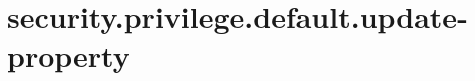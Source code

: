 \section{security.privilege.default.update-property}
\label{configuration:SecurityPrivilegeDefaultUpdateProperty}
\TODO
